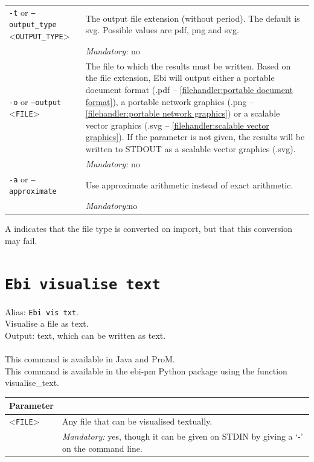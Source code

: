 {\begin{tabularx}{\linewidth}{lX}
\texttt{-t} or \texttt{--output\_type} <\texttt{OUTPUT\_TYPE}> &
The output file extension (without period). The default is svg. Possible values are pdf, png and svg.\\
&\textit{Mandatory:} \quad no\\
\texttt{-o} or \texttt{--output} <\texttt{FILE}> &
The file to which the results must be written. Based on the file extension, Ebi will output either a portable document format (.pdf -- \cref{filehandler:portable document format}), a portable network graphics (.png -- \cref{filehandler:portable network graphics}) or a scalable vector graphics (.svg -- \cref{filehandler:scalable vector graphics}).
If the parameter is not given, the results will be written to STDOUT as a scalable vector graphics (.svg).\\
&\textit{Mandatory:} \quad no\\
\texttt{-a} or \texttt{--approximate} & Use approximate arithmetic instead of exact arithmetic.\\
&\textit{Mandatory:}\quad no\\
\bottomrule
\end{tabularx}
A \textdagger{} indicates that the file type is converted on import, but that this conversion may fail.
\clearpage\section{\texttt{Ebi visualise text}}
\label{command:Ebi visualise text}
Alias: \texttt{Ebi vis txt}.\\
Visualise a file as text.\\
\noindent Output: text, which can be written as  text.\\
\\This command is available in Java and ProM.
\\This command is available in the ebi-pm Python package using the function visualise\_text.
\begin{tabularx}{\linewidth}{lX}
\toprule
Parameter \\\midrule
<\texttt{FILE}>&Any file that can be visualised textually.\\
&\textit{Mandatory:} \quad yes, though it can be given on STDIN by giving a `-' on the command line.\\

\end{tabularx}}
